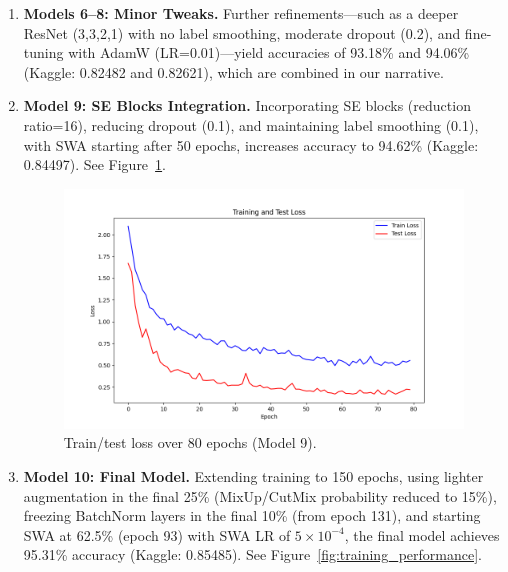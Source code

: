 \documentclass[letterpaper]{article}
\begin{document}
\begin{enumerate}
    \item \textbf{Models 6--8: Minor Tweaks.} Further refinements—such as a deeper ResNet (3,3,2,1) with no label smoothing, moderate dropout (0.2), and fine-tuning with AdamW (LR=0.01)—yield accuracies of 93.18\% and 94.06\% (Kaggle: 0.82482 and 0.82621), which are combined in our narrative.

    \item \textbf{Model 9: SE Blocks Integration.} Incorporating SE blocks (reduction ratio=16), reducing dropout (0.1), and maintaining label smoothing (0.1), with SWA starting after 50 epochs, increases accuracy to 94.62\% (Kaggle: 0.84497). See Figure~\ref{fig:training_performance_9462}.
    
    \begin{figure}[ht]
    \centering
         \includegraphics[scale=0.3]{train_test_loss_94.62.png}
    \caption{Train/test loss over 80 epochs (Model 9).}
    \label{fig:training_performance_9462}
    \end{figure}

    \item \textbf{Model 10: Final Model.} Extending training to 150 epochs, using lighter augmentation in the final 25\% (MixUp/CutMix probability reduced to 15\%), freezing BatchNorm layers in the final 10\% (from epoch 131), and starting SWA at 62.5\% (epoch 93) with SWA LR of $5\times10^{-4}$, the final model achieves 95.31\% accuracy (Kaggle: 0.85485). See Figure~\ref{fig:training_performance}.
    

\end{enumerate}
\end{document}
